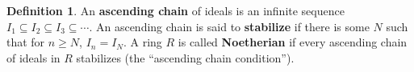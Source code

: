 \documentclass{amsart}
\theoremstyle{plain}
\theoremstyle{definition}
\newtheorem{definition}{Definition}[section]
\newtheorem{exercise}[theorem]{Exercise}
\theoremstyle{definition}
\newcommand{\defining}[1]{\textbf{#1}}
\DeclareMathOperator{\radname}{rad}
\newcommand{\rad}[1]{\radname(#1)}
\begin{document}
%








\begin{definition}
An \defining{ascending chain} of ideals is an infinite sequence
$I_1 \subseteq I_2 \subseteq I_3 \subseteq \cdots$.
An ascending chain is said to \defining{stabilize} if there is some $N$ such that
for $n \geq N$, $I_n = I_N$.
A ring $R$ is called \defining{Noetherian} if every ascending chain of ideals in $R$ stabilizes
(the ``ascending chain condition'').
\end{definition}
\end{document}
